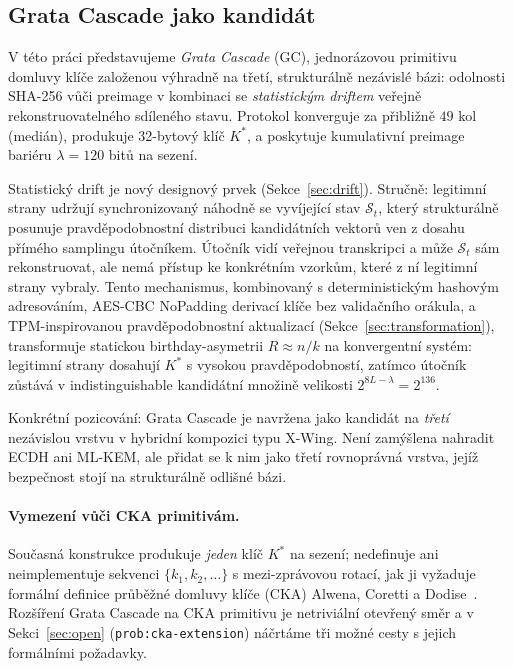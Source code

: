 \documentclass[11pt,a4paper]{article}
\begin{document}
\subsection{Grata Cascade jako kandidát}\label{sec:gc-as-candidate}

V této práci představujeme \emph{Grata Cascade} (GC), jednorázovou primitivu domluvy klíče založenou výhradně na třetí, strukturálně nezávislé bázi: odolnosti SHA-256 vůči preimage v kombinaci se \emph{statistickým driftem} veřejně rekonstruovatelného sdíleného stavu. Protokol konverguje za přibližně $49$ kol (medián), produkuje 32-bytový klíč $K^*$, a poskytuje kumulativní preimage bariéru $\lambda = 120$ bitů na sezení.

Statistický drift je nový designový prvek (Sekce~\ref{sec:drift}). Stručně: legitimní strany udržují synchronizovaný náhodně se vyvíjející stav $\mathcal{S}_t$, který strukturálně posunuje pravděpodobnostní distribuci kandidátních vektorů ven z dosahu přímého samplingu útočníkem. Útočník vidí veřejnou transkripci a může $\mathcal{S}_t$ sám rekonstruovat, ale nemá přístup ke konkrétním vzorkům, které z ní legitimní strany vybraly. Tento mechanismus, kombinovaný s deterministickým hashovým adresováním, AES-CBC NoPadding derivací klíče bez validačního orákula, a TPM-inspirovanou pravděpodobnostní aktualizací (Sekce~\ref{sec:transformation}), transformuje statickou birthday-asymetrii $R \approx n/k$ na konvergentní systém: legitimní strany dosahují $K^*$ s vysokou pravděpodobností, zatímco útočník zůstává v indistinguishable kandidátní množině velikosti $2^{8L - \lambda} = 2^{136}$.

Konkrétní pozicování: Grata Cascade je navržena jako kandidát na \emph{třetí} nezávislou vrstvu v hybridní kompozici typu X-Wing. Není zamýšlena nahradit ECDH ani ML-KEM, ale přidat se k nim jako třetí rovnoprávná vrstva, jejíž bezpečnost stojí na strukturálně odlišné bázi.

\paragraph{Vymezení vůči CKA primitivám.} Současná konstrukce produkuje \emph{jeden} klíč $K^*$ na sezení; nedefinuje ani neimplementuje sekvenci $\{k_1, k_2, \ldots\}$ s mezi-zprávovou rotací, jak ji vyžaduje formální definice průběžné domluvy klíče (CKA) Alwena, Coretti a Dodise~\cite{ACD19}. Rozšíření Grata Cascade na CKA primitivu je netriviální otevřený směr a v Sekci~\ref{sec:open} (\texttt{prob:cka-extension}) náčrtáme tři možné cesty s jejich formálními požadavky.
\end{document}
